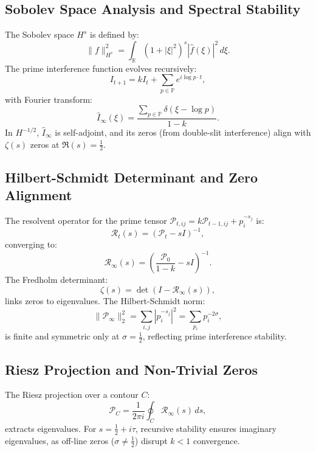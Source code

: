 \documentclass[11pt]{article}
\theoremstyle{plain}
\begin{document}
\subsection{Sobolev Space Analysis and Spectral Stability}
The Sobolev space \( H^s \) is defined by:
\begin{equation}
    \| f \|_{H^s}^2 = \int_{\mathbb{R}} (1 + |\xi|^2)^s |\hat{f}(\xi)|^2 \, d\xi.
\end{equation}
The prime interference function evolves recursively:
\begin{equation}
    I_{t+1} = k I_t + \sum_{p \in \mathbb{P}} e^{i \log p \cdot t},
\end{equation}
with Fourier transform:
\begin{equation}
    \hat{I}_\infty(\xi) = \frac{\sum_{p \in \mathbb{P}} \delta(\xi - \log p)}{1 - k}.
\end{equation}
In \( H^{-1/2} \), \( \hat{I}_\infty \) is self-adjoint, and its zeros (from double-slit interference) align with \( \zeta(s) \) zeros at \( \Re(s) = \frac{1}{2} \).

\subsection{Hilbert-Schmidt Determinant and Zero Alignment}
The resolvent operator for the prime tensor \( \mathcal{P}_{t,ij} = k \mathcal{P}_{t-1,ij} + p_i^{-s_j} \) is:
\begin{equation}
    \mathcal{R}_t(s) = (\mathcal{P}_t - s I)^{-1},
\end{equation}
converging to:
\begin{equation}
    \mathcal{R}_\infty(s) = \left( \frac{\mathcal{P}_0}{1 - k} - s I \right)^{-1}.
\end{equation}
The Fredholm determinant:
\begin{equation}
    \zeta(s) = \det(I - \mathcal{R}_\infty(s)),
\end{equation}
links zeros to eigenvalues. The Hilbert-Schmidt norm:
\begin{equation}
    \|\mathcal{P}_\infty\|_2^2 = \sum_{i,j} |p_i^{-s_j}|^2 = \sum_{p_i} p_i^{-2\sigma},
\end{equation}
is finite and symmetric only at \( \sigma = \frac{1}{2} \), reflecting prime interference stability.

\subsection{Riesz Projection and Non-Trivial Zeros}
The Riesz projection over a contour \( C \):
\begin{equation}
    \mathcal{P}_C = \frac{1}{2\pi i} \oint_C \mathcal{R}_\infty(s) \, ds,
\end{equation}
extracts eigenvalues. For \( s = \frac{1}{2} + i \tau \), recursive stability ensures imaginary eigenvalues, as off-line zeros (\( \sigma \neq \frac{1}{2} \)) disrupt \( k < 1 \) convergence.
\end{document}
